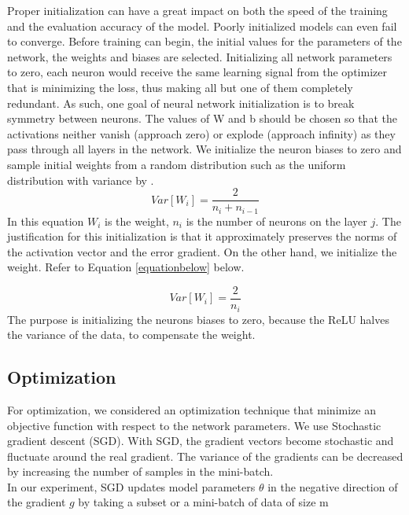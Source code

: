 Proper initialization can have a
great impact on both the speed of the training and the evaluation accuracy
of the model. Poorly initialized models can even fail to converge. Before training can begin, the initial values for the parameters of the network,
the weights and biases are selected. 
Initializing all network parameters to zero, each neuron would
receive the same learning signal from the optimizer that is minimizing the
loss, thus making all but one of them completely redundant. As such, one
goal of neural network initialization is to break symmetry between neurons. The values of W and b should be chosen so that the activations neither
vanish (approach zero) or explode (approach infinity) as they pass through
all layers in the network. We initialize the
neuron biases to zero and sample initial weights from a random distribution
such as the uniform distribution with variance by \cite{glorot2010understanding}.
\begin{equation}
    Var[W_{i}]=\frac{2}{n_{i}+n_{i-1}}
\end{equation}
In this equation $W_{i}$ is the weight, $n_{i}$ is the number of neurons on the layer $j$. The justification for this initialization is that it approximately preserves the norms of the activation vector and the error gradient. On the other hand, we initialize the weight. Refer to Equation \ref{equationbelow} below.

\begin{equation}\label{equationbelow}
     Var[W_{i}]=\frac{2}{n_{i}}
\end{equation}
The purpose is initializing the neurons biases to zero, because the ReLU halves the variance of the data, to compensate the weight.

\subsection{Optimization}
For optimization, we considered an optimization technique that minimize an objective function with respect to the network parameters. We use Stochastic gradient descent (SGD). With SGD, the gradient vectors become stochastic and fluctuate around
the real gradient. The variance of the gradients can be decreased by increasing the number of samples in the mini-batch.\\

In our experiment, SGD updates model parameters $\theta$ in the negative direction of the gradient $g$ by taking a subset or a mini-batch of data of size m


